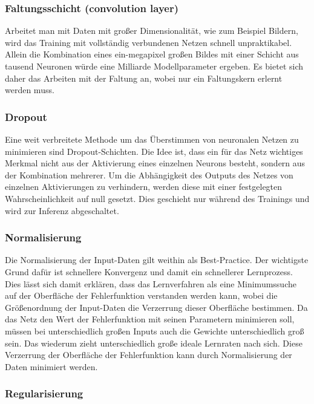 \subsubsection{Faltungsschicht (convolution layer)}

Arbeitet man mit Daten mit großer Dimensionalität, wie zum Beispiel Bildern, wird das Training mit vollständig verbundenen Netzen schnell unpraktikabel. Allein die Kombination eines ein-megapixel großen Bildes mit einer Schicht aus tausend Neuronen würde eine Milliarde Modellparameter ergeben.
Es bietet sich daher das Arbeiten mit der Faltung an, wobei nur ein Faltungskern erlernt werden muss.

\subsubsection{Dropout}

Eine weit verbreitete Methode um das Überstimmen von neuronalen Netzen zu minimieren sind Dropout-Schichten. Die Idee ist, dass ein für das Netz wichtiges Merkmal nicht aus der Aktivierung eines einzelnen Neurons besteht, sondern aus der Kombination mehrerer.
Um die Abhängigkeit des Outputs des Netzes von einzelnen Aktivierungen zu verhindern, werden diese mit einer festgelegten Wahrscheinlichkeit auf null gesetzt. Dies geschieht nur während des Trainings und wird zur Inferenz abgeschaltet.

\subsubsection{Normalisierung}

Die Normalisierung der Input-Daten gilt weithin als Best-Practice. Der wichtigste Grund dafür ist schnellere Konvergenz und damit ein schnellerer Lernprozess.
Dies lässt sich damit erklären, dass das Lernverfahren als eine Minimumssuche auf der Oberfläche der Fehlerfunktion verstanden werden kann, wobei die Größenordnung der Input-Daten die Verzerrung dieser Oberfläche bestimmen. Da das Netz den Wert der Fehlerfunktion mit seinen Parametern minimieren soll, müssen bei unterschiedlich großen Inputs auch die Gewichte unterschiedlich groß sein. Das wiederum zieht unterschiedlich große ideale Lernraten nach sich. Diese Verzerrung der Oberfläche der Fehlerfunktion kann durch Normalisierung der Daten minimiert werden.

\subsubsection{Regularisierung}

